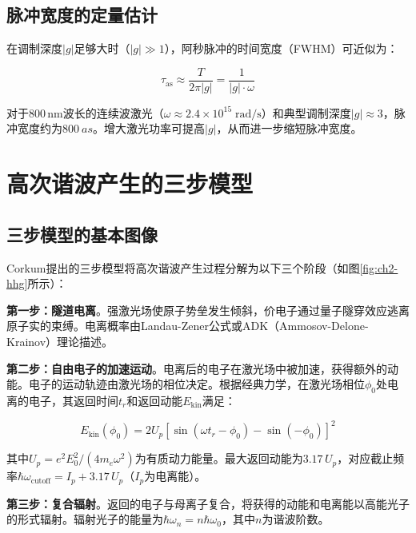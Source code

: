 \subsection{脉冲宽度的定量估计}
\label{subsec:pulse-duration}

在调制深度$|g|$足够大时（$|g| \gg 1$），阿秒脉冲的时间宽度（FWHM）可近似为：

\begin{equation}
    \label{eq:pulse-width}
    \tau_{\text{as}} \approx \frac{T}{2\pi |g|} = \frac{1}{|g| \cdot \omega}
\end{equation}

对于800\,nm波长的连续波激光（$\omega \approx 2.4 \times 10^{15}\;\text{rad/s}$）和典型调制深度$|g| \approx 3$，脉冲宽度约为$\SI{800}{as}$。增大激光功率可提高$|g|$，从而进一步缩短脉冲宽度。

\section{高次谐波产生的三步模型}
\label{sec:hhg}

\subsection{三步模型的基本图像}
\label{subsec:three-step}

Corkum\cite{Corkum1993}提出的三步模型将高次谐波产生过程分解为以下三个阶段（如图\ref{fig:ch2-hhg}所示）：

\textbf{第一步：隧道电离}。强激光场使原子势垒发生倾斜，价电子通过量子隧穿效应逃离原子实的束缚。电离概率由Landau-Zener公式或ADK（Ammosov-Delone-Krainov）理论描述。

\textbf{第二步：自由电子的加速运动}。电离后的电子在激光场中被加速，获得额外的动能。电子的运动轨迹由激光场的相位决定。根据经典力学，在激光场相位$\phi_0$处电离的电子，其返回时间$t_r$和返回动能$E_{\text{kin}}$满足：

\begin{equation}
    \label{eq:return-energy}
    E_{\text{kin}}(\phi_0) = 2 U_p \left[\sin(\omega t_r - \phi_0) - \sin(-\phi_0)\right]^2
\end{equation}

其中$U_p = e^2 E_0^2 / (4 m_e \omega^2)$为有质动力能量。最大返回动能为$3.17\,U_p$，对应截止频率$\hbar\omega_{\text{cutoff}} = I_p + 3.17\,U_p$（$I_p$为电离能）。

\textbf{第三步：复合辐射}。返回的电子与母离子复合，将获得的动能和电离能以高能光子的形式辐射。辐射光子的能量为$\hbar\omega_n = n\hbar\omega_0$，其中$n$为谐波阶数。

